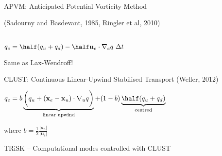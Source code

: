 \begin{frame}

\begin{block}{APVM: Anticipated Potential Vorticity Method}

\begin{minipage}{0.53\linewidth}\raggedright
(Sadourny and Basdevant, 1985, Ringler et al, 2010)

\ \\

$q_e = \half(q_u + q_d) - \half\mathbf{u}_e\cdot\nabla_e q~\Delta t$
\end{minipage}
\hfill
\begin{minipage}{0.45\linewidth}

\end{minipage}

Same as Lax-Wendroff!
\end{block}

\begin{block}{CLUST: \small\normalfont Continuous Linear-Upwind Stabilised Transport {\footnotesize (Weller, 2012)}}

$q_e = b
\underbrace{\biggl(
    q_u + (\mathbf{x}_e-\mathbf{x}_u)\cdot \nabla_u q
\biggr)}_{\text{linear upwind}}
+ (1-b)
\underbrace{
    \half (q_u + q_d)
}_{\text{centred}}
$

where $b = \frac{1}{2}\frac{|u_n|}{|\mathbf{u}_e|}$

\end{block}

\pause
TRiSK -- Computational modes controlled with CLUST \tick \smiley

\end{frame}

